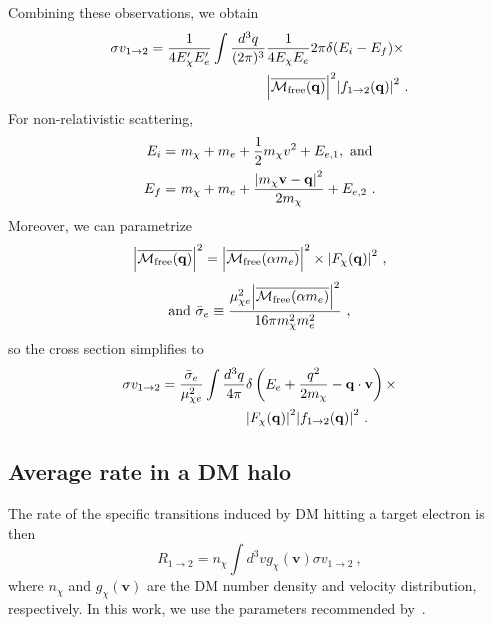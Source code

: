 \documentclass[
    prd, twocolumn, superscriptaddress, nofootinbib, amsmath, amssymb,
    aps, floatfix,preprintnumbers
]{revtex4-2}
\begin{document}
        Combining these observations, we obtain
        \begin{equation}
            \begin{split}
                \sigma v_\mathrm{1\rightarrow2} = \frac{1}{4E_\chi^\prime E_e^\prime}\int\frac{d^3q}{(2\pi)^3}&\frac{1}{4E_\chi E_e}2\pi\delta(E_i - E_f)\times\\
                &\abs{\overline{\mathcal{M}_\mathrm{free}(\mathbf{q})}}^2\abs{f_{1\rightarrow2} (\mathbf{q})}^2\ .
            \end{split}
        \end{equation}
        For non-relativistic scattering, 
        \begin{equation}
            \begin{split}
                E_i =&\ m_\chi + m_e + \frac{1}{2}m_\chi v^2 + E_{e,1}, \text{ and}\\
                E_f =&\ m_\chi + m_e + \frac{\abs{m_\chi\mathbf{v - q}}^2}{2m_\chi} + E_{e,2}\ .
            \end{split}
        \end{equation}
        Moreover, we can parametrize 
        \begin{equation*}
            \abs{\overline{\mathcal{M}_\mathrm{free}(\mathbf{q})}}^2 = \abs{\overline{\mathcal{M}_\mathrm{free}(\alpha m_e)}}^2\times \abs{F_\chi (\mathbf{q})}^2\ ,
        \end{equation*}
        \begin{equation}
            \text{and }\Bar{\sigma}_e \equiv \frac{\mu_{\chi e}^2\abs{\overline{\mathcal{M}_\mathrm{free}(\alpha m_e)}}^2}{16\pi m_\chi^2 m_e^2}\ ,
        \end{equation}
        so the cross section simplifies to 
        \begin{equation}\label{eq:cross_section}
            \begin{split}
                \sigma v_\mathrm{1\rightarrow2} = \frac{\Bar{\sigma}_e}{\mu_{\chi e}^2} \int \frac{d^3q}{4\pi} & \delta\left(E_e + \frac{q^2}{2m_\chi} - \mathbf{q\cdot v}\right)\times\\
                &\abs{F_\chi (\mathbf{q})}^2\abs{f_{1\rightarrow2} (\mathbf{q})}^2 \ .
            \end{split}
        \end{equation}
    
    \subsection{Average rate in a DM halo}
        The rate of the specific transitions induced by DM hitting a target electron is then
        \begin{equation}
            R_{1\rightarrow2} = n_\chi \int d^3 v g_\chi(\mathbf{v}) \sigma v_{1\rightarrow2}\ ,
        \end{equation}
        where $n_\chi$ and $g_\chi(\mathbf{v})$ are the DM number density and velocity distribution, respectively. In this work, we use the parameters recommended by~\cite{Baxter2021}. 
        
\end{document}
